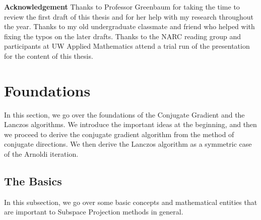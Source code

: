 \documentclass[]{article}
\theoremstyle{definition}
\begin{document}
    \newpage
\begin{center}\large
    \textbf{Acknowledgement}
    Thanks to Professor Greenbaum for taking the time to review the first draft of this thesis and for her help with my research throughout the year. Thanks to my old undergraduate classmate and friend who helped with fixing the typos on the later drafts. Thanks to the NARC reading group and participants at UW Applied Mathematics attend a trial run of the presentation for the content of this thesis. 
\end{center}


\newpage
\section{Foundations}
    In this section, we go over the foundations of the Conjugate Gradient and the Lanczos algorithms. We introduce the important ideas at the beginning, and then we proceed to derive the conjugate gradient algorithm from the method of conjugate directions.  We then derive the Lanczos algorithm as a symmetric case of the Arnoldi iteration. 
    \subsection{The Basics}
        In this subsection, we go over some basic concepts and mathematical entities that are important to Subspace Projection methods in general. 
\end{document}
